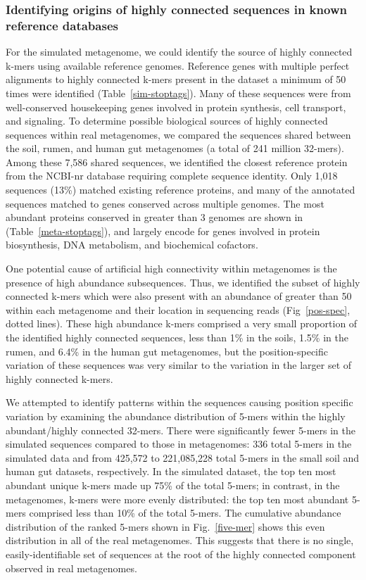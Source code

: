 \documentclass[10pt]{article}
\begin{document}
\subsubsection*{Identifying origins of highly connected sequences in known reference databases}

For the simulated metagenome, we could identify the source of highly
connected k-mers using available reference genomes. Reference genes
with multiple perfect alignments to highly connected k-mers present in
the dataset a minimum of 50 times were identified (Table~\ref{sim-stoptags}).  Many of
these sequences were from well-conserved housekeeping genes involved
in protein synthesis, cell transport, and signaling.  To determine
possible biological sources of highly connected sequences within real
metagenomes, we compared the sequences shared between the soil, rumen,
and human gut metagenomes (a total of 241 million 32-mers).  Among these 7,586 shared sequences, we identified the closest reference
protein from the NCBI-nr database requiring complete sequence
identity.  Only 1,018 sequences (13\%) matched existing reference
proteins, and many of the annotated sequences matched to
genes conserved across multiple genomes.  The most abundant
proteins conserved in greater than 3 genomes are shown in (Table~\ref{meta-stoptags}), and
largely encode for genes involved in protein biosynthesis, DNA
metabolism, and biochemical cofactors.

One potential cause of artificial high connectivity within metagenomes
is the presence of high abundance subsequences.  Thus, we identified the
subset of highly connected k-mers which were also present with an
abundance of greater than 50 within each metagenome and their location
in sequencing reads (Fig~\ref{pos-spec}, dotted lines).  These high abundance
k-mers comprised a very small proportion of the identified highly
connected sequences, less than 1\% in the soils, 1.5\% in the rumen,
and 6.4\% in the human gut metagenomes, but the position-specific
variation of these sequences was very similar to the variation in the
larger set of highly connected k-mers.

We attempted to identify patterns within the sequences causing
position specific variation by examining the abundance distribution of
5-mers within the highly abundant/highly connected 32-mers.  There
were significantly fewer 5-mers in the simulated sequences compared to
those in metagenomes: 336 total 5-mers in the simulated data and from
425,572 to 221,085,228 total 5-mers in the small soil and human gut
datasets, respectively.  In the simulated dataset, the top ten most
abundant unique k-mers made up 75\% of the total 5-mers; in contrast,
in the metagenomes, k-mers were more evenly distributed: the top ten
most abundant 5-mers comprised less than 10\% of the total 5-mers.
The cumulative abundance distribution of the ranked 5-mers shown in
Fig.~\ref{five-mer} shows this even distribution in all of the real metagenomes.
This suggests that there is no single, easily-identifiable set of
sequences at the root of the highly connected component observed in
real metagenomes.
\end{document}
